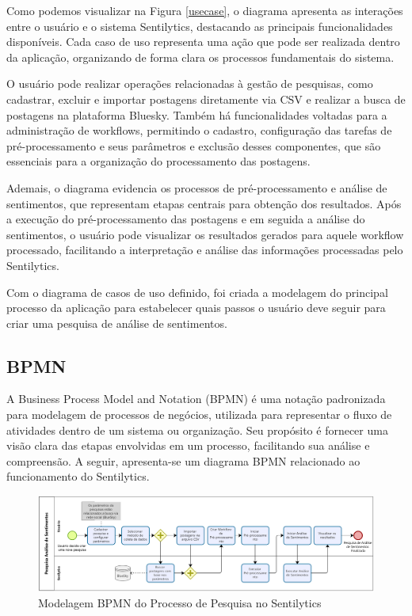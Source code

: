 \documentclass[
	12pt,				%
	oneside,			%
	a4paper,			%
	english,			%
	french,				%
	spanish,			%
	brazil				%
	]{abntex2}
\begin{document}
Como podemos visualizar na Figura \ref{usecase}, o diagrama apresenta as
interações entre o usuário e o sistema Sentilytics, destacando as
principais funcionalidades disponíveis. Cada caso de uso representa uma
ação que pode ser realizada dentro da aplicação, organizando de forma
clara os processos fundamentais do sistema.

O usuário pode realizar operações relacionadas à gestão de pesquisas,
como cadastrar, excluir e importar postagens diretamente via CSV e
realizar a busca de postagens na plataforma Bluesky. Também há
funcionalidades voltadas para a administração de workflows, permitindo o
cadastro, configuração das tarefas de pré-processamento e seus
parâmetros e exclusão desses componentes, que são essenciais para a
organização do processamento das postagens.

Ademais, o diagrama evidencia os processos de pré-processamento e
análise de sentimentos, que representam etapas centrais para obtenção
dos resultados. Após a execução do pré-processamento das postagens e em
seguida a análise do sentimentos, o usuário pode visualizar os
resultados gerados para aquele workflow processado, facilitando a
interpretação e análise das informações processadas pelo Sentilytics.

Com o diagrama de casos de uso definido, foi criada a modelagem do
principal processo da aplicação para estabelecer quais passos o usuário
deve seguir para criar uma pesquisa de análise de sentimentos.

\hypertarget{bpmn}{%
\subsection{BPMN}\label{bpmn}}

A Business Process Model and Notation (BPMN) é uma notação padronizada
para modelagem de processos de negócios, utilizada para representar o
fluxo de atividades dentro de um sistema ou organização. Seu propósito é
fornecer uma visão clara das etapas envolvidas em um processo,
facilitando sua análise e compreensão. A seguir, apresenta-se um
diagrama BPMN relacionado ao funcionamento do Sentilytics.

\begin{figure}[htbp]
\hypertarget{bpmn_pesquisa}{%
\caption{Modelagem BPMN do Processo de Pesquisa no Sentilytics}\label{bpmn_pesquisa}
\begin{center}
\includegraphics[scale=0.3]{imagens/sentilytics/pesquisa_sentimentos.png}
\end{center}
}
\end{figure}
\end{document}
